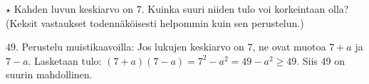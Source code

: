 \begin{tehtavasivu}
\begin{tehtava} %
    $\star$ Kahden luvun keskiarvo on $7$. Kuinka suuri niiden tulo voi korkeintaan olla?
    \\ (Keksit vastaukset todennäköisesti helpommin kuin sen perustelun.)
    \begin{vastaus}
        $49$. Perustelu muistikaavoilla: Jos lukujen keskiarvo on $7$, ne ovat muotoa $7+a$ ja $7-a$. Lasketaan tulo: $(7+a)(7-a)=7^2-a^2 = 49-a^2 \geq 49$. Siis 49 on suurin
        mahdollinen.
    \end{vastaus}
\end{tehtava}

\end{tehtavasivu}